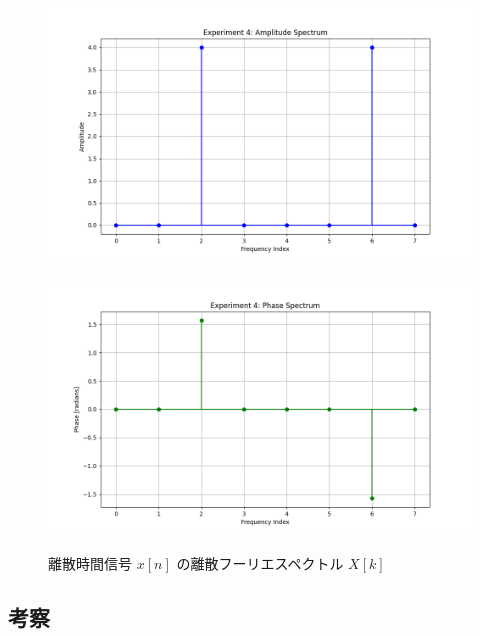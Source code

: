 \documentclass[fleqn, a4paper. 12pt]{jsarticle}
\begin{document}
  \begin{figure}[h]
    \begin{center}
    \begin{minipage}[t]{0.48\columnwidth}
        \includegraphics[width=\columnwidth]{amplitude_spectrum_experiment_4.png}
        \label{fign:a4}
    \end{minipage}
    \begin{minipage}[t]{0.48\columnwidth}
        \includegraphics[width=\columnwidth]{phase_spectrum_experiment_4.png}
        \label{fign:p4}
    \end{minipage}
    \end{center}
    \caption{離散時間信号 $x[n]$ の離散フーリエスペクトル $X[k]$}
  \end{figure}

  \subsection*{考察}
\end{document}
